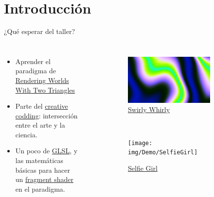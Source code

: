 \section{Introducción}
\begin{frame}{¿Qué esperar del taller?}
\begin{columns}
    \begin{itemize}
         \item Aprender el paradigma de \href{https://iquilezles.org/articles/nvscene2008/rwwtt.pdf}{Rendering Worlds With Two Triangles}
         \item Parte del \href{https://www.smu.edu/meadows/newsandevents/news/2023/what-is-creative-coding}{creative codding}: intersección entre el arte y la ciencia. 
         \item Un poco de \href{https://www.khronos.org/opengl/wiki/OpenGL_Shading_Language}{GLSL}, y las matemáticas básicas para hacer un \href{https://www.khronos.org/opengl/wiki/Portal:OpenGL_Shading_Language/Fragment_Shader}{fragment shader} en el paradigma.
     \end{itemize}
\begin{figure}[htp]
 \centering
 \begin{subfigure}[b]{0.42\textwidth}
   \includegraphics[width=\textwidth]{img/Demo/SwirlyWhirly}
   \caption{\href{https://www.shadertoy.com/view/X3dBRr}{Swirly Whirly}}
 \end{subfigure}
~
 \begin{subfigure}[b]{0.42\textwidth}
   \texttt{[image: img/Demo/SelfieGirl]}
   \caption{\href{https://www.shadertoy.com/view/WsSBzh}{Selfie Girl}}
 \end{subfigure}
\\
 \begin{subfigure}[b]{0.42\textwidth}

\end{subfigure}
\end{figure}
\end{columns}
\end{frame}
